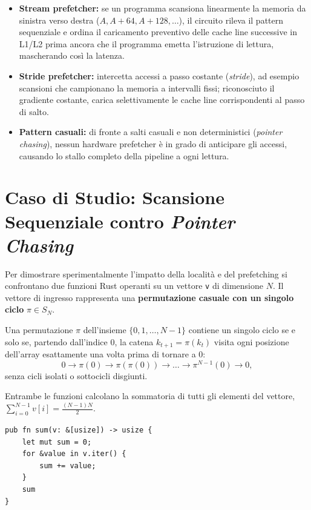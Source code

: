\begin{itemize}
    \item \textbf{Stream prefetcher:} se un programma scansiona linearmente la memoria da sinistra verso destra ($A, A+64, A+128, \dots$), il circuito rileva il pattern sequenziale e ordina il caricamento preventivo delle cache line successive in L1/L2 prima ancora che il programma emetta l'istruzione di lettura, mascherando cos\`i la latenza.
    \item \textbf{Stride prefetcher:} intercetta accessi a passo costante (\textit{stride}), ad esempio scansioni che campionano la memoria a intervalli fissi; riconosciuto il gradiente costante, carica selettivamente le cache line corrispondenti al passo di salto.
    \item \textbf{Pattern casuali:} di fronte a salti casuali e non deterministici (\textit{pointer chasing}), nessun hardware prefetcher \`e in grado di anticipare gli accessi, causando lo stallo completo della pipeline a ogni lettura.
\end{itemize}

\FloatBarrier
\section{Caso di Studio: Scansione Sequenziale contro \textit{Pointer Chasing}}
\label{sec:pointer-chasing}

Per dimostrare sperimentalmente l'impatto della localit\`a e del prefetching si confrontano due funzioni Rust operanti su un vettore \texttt{v} di dimensione $N$. Il vettore di ingresso rappresenta una \textbf{permutazione casuale con un singolo ciclo} $\pi \in S_N$.

\begin{definition}
Una permutazione $\pi$ dell'insieme $\{0, 1, \dots, N-1\}$ contiene un singolo ciclo se e solo se, partendo dall'indice $0$, la catena $k_{t+1} = \pi(k_t)$ visita ogni posizione dell'array esattamente una volta prima di tornare a $0$:
\[
0 \to \pi(0) \to \pi(\pi(0)) \to \dots \to \pi^{N-1}(0) \to 0,
\]
senza cicli isolati o sottocicli disgiunti.
\end{definition}

Entrambe le funzioni calcolano la sommatoria di tutti gli elementi del vettore, $\sum_{i=0}^{N-1} v[i] = \frac{(N-1)N}{2}$.

\begin{lstlisting}[style=rustcode,caption={Scansione sequenziale lineare.}]
pub fn sum(v: &[usize]) -> usize {
    let mut sum = 0;
    for &value in v.iter() {
        sum += value;
    }
    sum
}
\end{lstlisting}

